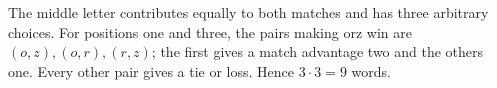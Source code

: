 The middle letter contributes equally to both matches and has three arbitrary choices. For positions one and three, the pairs making orz win are $(o,z),(o,r),(r,z)$; the first gives a match advantage two and the others one. Every other pair gives a tie or loss. Hence $3\cdot3=\boxed9$ words.
